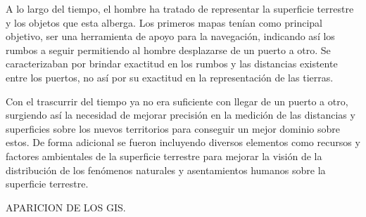 A lo largo del tiempo, el hombre ha tratado de representar la superficie terrestre y los objetos que esta alberga.
Los primeros mapas tenían como principal objetivo, ser una herramienta de apoyo para la navegación, indicando así
los rumbos a seguir permitiendo al hombre desplazarse de un puerto a otro. Se caracterizaban por brindar exactitud
en los rumbos y las distancias existente entre los puertos, no así por su exactitud en la representación de las
tierras. 

Con el trascurrir del tiempo ya no era suficiente con llegar de un puerto a otro, surgiendo así la
necesidad de mejorar precisión en la medición de las distancias y superficies sobre los nuevos territorios para
conseguir un mejor dominio sobre estos. De forma adicional se fueron incluyendo diversos elementos como recursos y
factores ambientales de la superficie terrestre para mejorar la visión de la distribución de los fenómenos
naturales y asentamientos humanos sobre la superficie terrestre.


APARICION DE LOS GIS.



